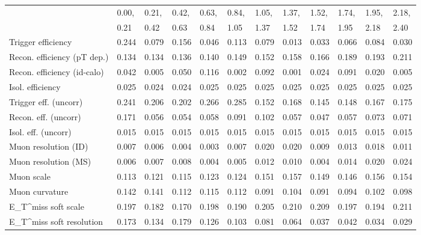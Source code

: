 \begin{tabular}{l|p{0.6cm}p{0.6cm}p{0.6cm}p{0.6cm}p{0.6cm}p{0.6cm}p{0.6cm}p{0.6cm}p{0.6cm}p{0.6cm}p{0.6cm}}
\hline
   & 0.00, & 0.21, & 0.42, & 0.63, & 0.84, & 1.05, & 1.37, & 1.52, & 1.74, & 1.95, & 2.18,  \\ 
   & 0.21 & 0.42 & 0.63 & 0.84 & 1.05 & 1.37 & 1.52 & 1.74 & 1.95 & 2.18 & 2.40  \\ 
\hline
Trigger efficiency                       & 0.244 & 0.079 & 0.156 & 0.046 & 0.113 & 0.079 & 0.013 & 0.033 & 0.066 & 0.084 & 0.030 \\
Recon. efficiency (pT dep.)              & 0.134 & 0.134 & 0.136 & 0.140 & 0.149 & 0.152 & 0.158 & 0.166 & 0.189 & 0.193 & 0.211 \\
Recon. efficiency (id-calo)              & 0.042 & 0.005 & 0.050 & 0.116 & 0.002 & 0.092 & 0.001 & 0.024 & 0.091 & 0.020 & 0.005 \\
Isol. efficiency                         & 0.025 & 0.024 & 0.024 & 0.025 & 0.025 & 0.025 & 0.025 & 0.025 & 0.025 & 0.025 & 0.025 \\
Trigger eff. (uncorr)                    & 0.241 & 0.206 & 0.202 & 0.266 & 0.285 & 0.152 & 0.168 & 0.145 & 0.148 & 0.167 & 0.175 \\
Recon. eff. (uncorr)                     & 0.171 & 0.056 & 0.054 & 0.058 & 0.091 & 0.102 & 0.057 & 0.047 & 0.057 & 0.073 & 0.071 \\
Isol. eff. (uncorr)                      & 0.015 & 0.015 & 0.015 & 0.015 & 0.015 & 0.015 & 0.015 & 0.015 & 0.015 & 0.015 & 0.015 \\
Muon resolution (ID)                     & 0.007 & 0.006 & 0.004 & 0.003 & 0.007 & 0.020 & 0.020 & 0.009 & 0.013 & 0.018 & 0.011 \\
Muon resolution (MS)                     & 0.006 & 0.007 & 0.008 & 0.004 & 0.005 & 0.012 & 0.010 & 0.004 & 0.014 & 0.020 & 0.024 \\
Muon scale                               & 0.113 & 0.121 & 0.115 & 0.123 & 0.124 & 0.151 & 0.157 & 0.149 & 0.146 & 0.156 & 0.154 \\
Muon curvature                           & 0.142 & 0.141 & 0.112 & 0.115 & 0.112 & 0.091 & 0.104 & 0.091 & 0.094 & 0.102 & 0.098 \\
E_{T}^{miss} soft scale                  & 0.197 & 0.182 & 0.170 & 0.198 & 0.190 & 0.205 & 0.210 & 0.209 & 0.197 & 0.194 & 0.211 \\
E_{T}^{miss} soft resolution             & 0.173 & 0.134 & 0.179 & 0.126 & 0.103 & 0.081 & 0.064 & 0.037 & 0.042 & 0.034 & 0.029 \\

\end{tabular}
